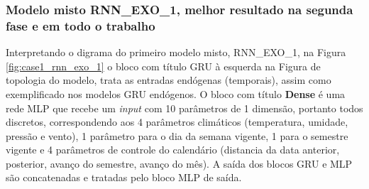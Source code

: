         \subsubsection{Modelo misto RNN\_EXO\_1, melhor resultado na segunda fase e em todo o trabalho}
            Interpretando o digrama do primeiro modelo misto, RNN\_EXO\_1, na Figura \ref{fig:case1_rnn_exo_1} o bloco com título GRU à esquerda na Figura de topologia do modelo, trata as entradas endógenas (temporais), assim como exemplificado nos modelos GRU endógenos. O bloco com título \textbf{Dense} é uma rede MLP que recebe um \textit{input} com 10 parâmetros de 1 dimensão, portanto todos discretos, correspondendo aos 4 parâmetros climáticos (temperatura, umidade, pressão e vento), 1 parâmetro para o dia da semana vigente, 1 para o semestre vigente e 4 parâmetros de controle do calendário (distancia da data anterior, posterior, avanço do semestre, avanço do mês). A saída dos blocos GRU e MLP são concatenadas e tratadas pelo bloco MLP de saída.
            \begin{figure}[H]
            \end{figure}
